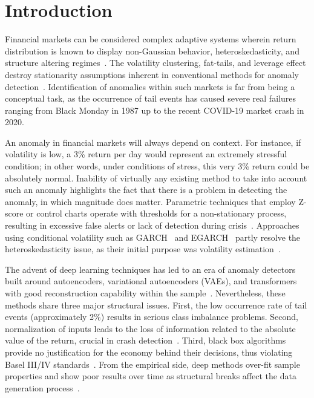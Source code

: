 \documentclass[]{interact}
\begin{document}
\section{Introduction}
Financial markets can be considered complex adaptive systems wherein return distribution is known to display
non-Gaussian behavior, heteroskedasticity, and structure altering regimes~\citep{mandelbrot1963variation, cont2001empirical}. The volatility clustering, fat-tails, and
leverage effect destroy stationarity assumptions inherent in
conventional methods for anomaly detection~\citep{bouchaud2001more, fama1970efficient}. Identification of anomalies within such markets is far from being a
conceptual task, as the occurrence of tail events has caused
severe real failures ranging from Black Monday in 1987 up to
the recent COVID-19 market crash in 2020.

An anomaly in financial markets will always depend
on context. For instance, if volatility is low, a 3\% return per
day would represent an extremely stressful condition; in other
words, under conditions of stress, this very 3\% return could
be absolutely normal. Inability of virtually any existing method to take into account such an anomaly highlights the fact
that there is a problem in detecting the anomaly, in which
magnitude does matter. Parametric techniques that employ
Z-score or control charts operate with thresholds for a non-stationary process, resulting in excessive false alerts or lack
of detection during crisis~\citep{chandola2009anomaly}. Approaches using conditional
volatility such as GARCH~\citep{bollerslev1986a} and EGARCH~\citep{nelson1991egarch} partly resolve
the heteroskedasticity issue, as their initial purpose was volatility estimation~\citep{engle1982arch, hansen1994autoregressive}.

The advent of deep learning techniques has led to an era
of anomaly detectors built around autoencoders, variational autoencoders (VAEs), and transformers with good reconstruction capability within the sample~\citep{darban2023deep, pang2021deep}. Nevertheless, these methods share three major structural issues. First,
the low occurrence rate of tail events (approximately 2\%)
results in serious class imbalance problems. Second, normalization of inputs leads to the loss of information related
to the absolute value of the return, crucial in crash detection~\citep{crepey2022anoma}. Third, black box algorithms provide no justification for the economy behind their decisions, thus violating
Basel III/IV standards~\citep{arrieta2020explainable}. From the empirical side, deep
methods over-fit sample properties and show poor results over
time as structural breaks affect the data generation process~\citep{liu2024times}.
\end{document}
